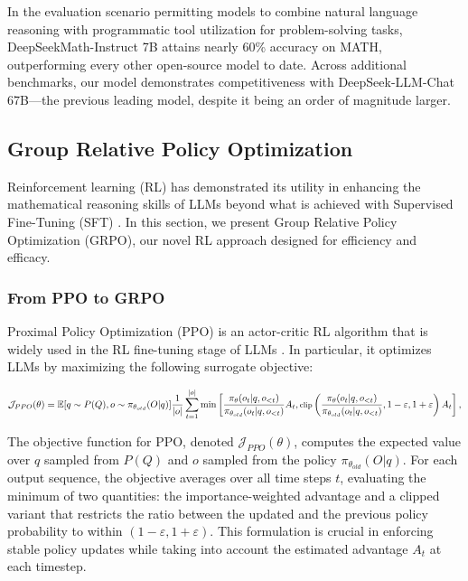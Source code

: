 \begin{itemize}[topsep=0pt]
\begin{itemize}[topsep=0pt]
In the evaluation scenario permitting models to combine natural language reasoning with programmatic tool utilization for problem-solving tasks, DeepSeekMath-Instruct 7B attains nearly 60\% accuracy on MATH, outperforming every other open-source model to date. Across additional benchmarks, our model demonstrates competitiveness with DeepSeek-LLM-Chat 67B—the previous leading model, despite it being an order of magnitude larger.

\subsection{Group Relative Policy Optimization} Reinforcement learning (RL) has demonstrated its utility in enhancing the mathematical reasoning skills of LLMs beyond what is achieved with Supervised Fine-Tuning (SFT) \citep{wang2023math,wizardmath}. In this section, we present Group Relative Policy Optimization (GRPO), our novel RL approach designed for efficiency and efficacy.

\subsubsection{From PPO to GRPO} Proximal Policy Optimization (PPO) \citep{schulman2017proximal} is an actor-critic RL algorithm that is widely used in the RL fine-tuning stage of LLMs \citep{ouyang2022training}. In particular, it optimizes LLMs by maximizing the following surrogate objective:

\begin{equation}
\footnotesize
    \mathcal{J}_{PPO}(\theta) = \mathbb{E}{[q \sim P(Q), o \sim \pi_{\theta_{old}}(O|q)]} \frac{1}{|o|} \sum_{t=1}^{|o|} \min \left[ \frac{\pi_\theta(o_{t} | q, o_{<t})}{\pi_{\theta_{old}}(o_{t} | q, o_{<t})} A_{t}, \text{clip} \left( \frac{\pi_\theta(o_{t} | q, o_{<t})}{\pi_{\theta_{old}}(o_{t} | q, o_{<t})}, 1 - \varepsilon, 1 + \varepsilon \right)  A_{t} \right] ,
\end{equation}

The objective function for PPO, denoted $\mathcal{J}_{PPO}(\theta)$, computes the expected value over $q$ sampled from $P(Q)$ and $o$ sampled from the policy $\pi_{\theta_{old}}(O|q)$. For each output sequence, the objective averages over all time steps $t$, evaluating the minimum of two quantities: the importance-weighted advantage and a clipped variant that restricts the ratio between the updated and the previous policy probability to within $(1 - \varepsilon, 1 + \varepsilon)$. This formulation is crucial in enforcing stable policy updates while taking into account the estimated advantage $A_t$ at each timestep.


\end{itemize}
\end{itemize}
